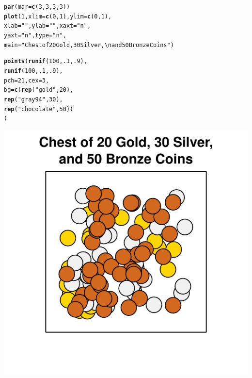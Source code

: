 \documentclass{tufte-book}\usepackage[]{graphicx}\usepackage[]{color}
\makeatletter
\def\maxwidth{ %
  \ifdim\Gin@nat@width>\linewidth
    \linewidth
  \else
    \Gin@nat@width
  \fi
}
\newcommand{\hlnum}[1]{\textcolor[rgb]{0.686,0.059,0.569}{#1}}%
\newcommand{\hlstr}[1]{\textcolor[rgb]{0.192,0.494,0.8}{#1}}%
\newcommand{\hlstd}[1]{\textcolor[rgb]{0.345,0.345,0.345}{#1}}%
\newcommand{\hlkwc}[1]{\textcolor[rgb]{0.333,0.667,0.333}{#1}}%
\newcommand{\hlkwd}[1]{\textcolor[rgb]{0.737,0.353,0.396}{\textbf{#1}}}%
\newenvironment{kframe}{%
 \def\at@end@of@kframe{}%
 \ifinner\ifhmode%
  \def\at@end@of@kframe{\end{minipage}}%
  \begin{minipage}{\columnwidth}%
 \fi\fi%
 \def\FrameCommand##1{\hskip\@totalleftmargin \hskip-\fboxsep
 \colorbox{shadecolor}{##1}\hskip-\fboxsep
     \hskip-\linewidth \hskip-\@totalleftmargin \hskip\columnwidth}%
 \MakeFramed {\advance\hsize-\width
   \@totalleftmargin\z@ \linewidth\hsize
   \@setminipage}}%
 {\par\unskip\endMakeFramed%
 \at@end@of@kframe}
\newenvironment{knitrout}{}{} %
\makeatother
\begin{document}
\begin{marginfigure}
\begin{tiny}
\begin{knitrout}
\color{fgcolor}\begin{kframe}
\begin{alltt}
\hlkwd{par}\hlstd{(}\hlkwc{mar} \hlstd{=} \hlkwd{c}\hlstd{(}\hlnum{3}\hlstd{,} \hlnum{3}\hlstd{,} \hlnum{3}\hlstd{,} \hlnum{3}\hlstd{))}
\hlkwd{plot}\hlstd{(}\hlnum{1}\hlstd{,} \hlkwc{xlim} \hlstd{=} \hlkwd{c}\hlstd{(}\hlnum{0}\hlstd{,} \hlnum{1}\hlstd{),} \hlkwc{ylim} \hlstd{=} \hlkwd{c}\hlstd{(}\hlnum{0}\hlstd{,} \hlnum{1}\hlstd{),}
     \hlkwc{xlab} \hlstd{=} \hlstr{""}\hlstd{,} \hlkwc{ylab} \hlstd{=} \hlstr{""}\hlstd{,} \hlkwc{xaxt} \hlstd{=} \hlstr{"n"}\hlstd{,}
     \hlkwc{yaxt} \hlstd{=} \hlstr{"n"}\hlstd{,} \hlkwc{type} \hlstd{=} \hlstr{"n"}\hlstd{,}
     \hlkwc{main} \hlstd{=} \hlstr{"Chest of 20 Gold, 30 Silver,\textbackslash{}nand 50 Bronze Coins"}\hlstd{)}

\hlkwd{points}\hlstd{(}\hlkwd{runif}\hlstd{(}\hlnum{100}\hlstd{,} \hlnum{.1}\hlstd{,} \hlnum{.9}\hlstd{),}
       \hlkwd{runif}\hlstd{(}\hlnum{100}\hlstd{,} \hlnum{.1}\hlstd{,} \hlnum{.9}\hlstd{),}
       \hlkwc{pch} \hlstd{=} \hlnum{21}\hlstd{,} \hlkwc{cex} \hlstd{=} \hlnum{3}\hlstd{,}
       \hlkwc{bg} \hlstd{=} \hlkwd{c}\hlstd{(}\hlkwd{rep}\hlstd{(}\hlstr{"gold"}\hlstd{,} \hlnum{20}\hlstd{),}
              \hlkwd{rep}\hlstd{(}\hlstr{"gray94"}\hlstd{,} \hlnum{30}\hlstd{),}
              \hlkwd{rep}\hlstd{(}\hlstr{"chocolate"}\hlstd{,} \hlnum{50}\hlstd{))}
       \hlstd{)}
\end{alltt}
\end{kframe}
\includegraphics[width=\maxwidth]{figure/unnamed-chunk-183-1} 

\end{knitrout}
\end{tiny}
\end{marginfigure}
\end{document}
